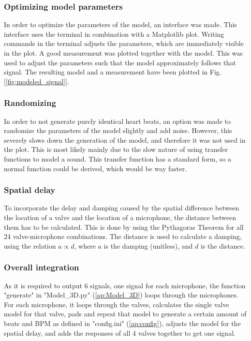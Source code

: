 \subsubsection{Optimizing model parameters}
In order to optimize the parameters of the model, an interface was made. This interface uses the terminal in combination with a Matplotlib plot. Writing commands in the terminal adjusts the parameters, which are immediately visible in the plot. 
A good measurement was plotted together with the model. This was used to adjust the parameters such that the model approximately follows that signal. The resulting model and a measurement have been plotted in Fig. [\ref{fig:modeled_signal}].

\subsubsection{Randomizing}
In order to not generate purely identical heart beats, an option was made to randomize the parameters of the model slightly and add noise. However, this severely slows down the generation of the model, and therefore it was not used in the plot. This is most likely mainly due to the slow nature of using transfer functions to model a sound. This transfer function has a standard form, so a normal function could be derived, which would be way faster.

\subsubsection{Spatial delay}
To incorporate the delay and damping caused by the spatial difference between the location of a valve and the location of a microphone, the distance between them has to be calculated. This is done by using the Pythagoras Theorem for all 24 valve-microphone combinations. The distance is used to calculate a damping, using the relation $a \propto d$, where $a$ is the damping (unitless), and $d$ is the distance. 

\subsubsection{Overall integration}
As it is required to output 6 signals, one signal for each microphone, the function "generate" in "Model\_3D.py" (\ref{ap:Model_3D}) loops through the microphones. For each microphone, it loops through the valves, calculates the single valve model for that valve, pads and repeat that model to generate a certain amount of beats and BPM as defined in "config.ini" (\ref{ap:config}), adjusts the model for the spatial delay, and adds the responses of all 4 valves together to get one signal. 

